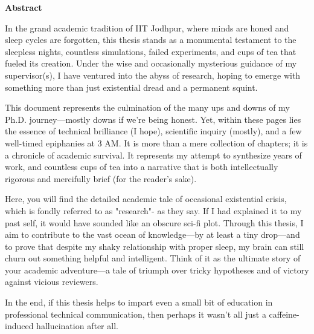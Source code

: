 \begin{flushright}
\huge{\textbf{Abstract}}
\end{flushright}




In the grand academic tradition of IIT Jodhpur, where minds are honed and sleep cycles are forgotten, this thesis stands as a monumental testament to the sleepless nights, countless simulations, failed experiments, and cups of tea that fueled its creation. Under the wise and occasionally mysterious guidance of my supervisor(s), I have ventured into the abyss of research, hoping to emerge with something more than just existential dread and a permanent squint.

This document represents the culmination of the many ups and downs of my Ph.D. journey—mostly downs if we're being honest. Yet, within these pages lies the essence of technical brilliance (I hope), scientific inquiry (mostly), and a few well-timed epiphanies at 3 AM. It is more than a mere collection of chapters; it is a chronicle of academic survival.  It represents my attempt to synthesize years of work, and countless cups of tea into a narrative that is both intellectually rigorous and mercifully brief (for the reader's sake).

Here, you will find the detailed academic tale of occasional existential crisis, which is fondly referred to as "research"- as they say. If I had explained it to my past self, it would have sounded like an obscure sci-fi plot. Through this thesis, I aim to contribute to the vast ocean of knowledge—by at least a tiny drop—and to prove that despite my shaky relationship with proper sleep, my brain can still churn out something helpful and intelligent. Think of it as the ultimate story of your academic adventure—a tale of triumph over tricky hypotheses and of victory against vicious reviewers.

In the end, if this thesis helps to impart even a small bit of education in professional technical communication, then perhaps it wasn’t all just a caffeine-induced hallucination after all.

